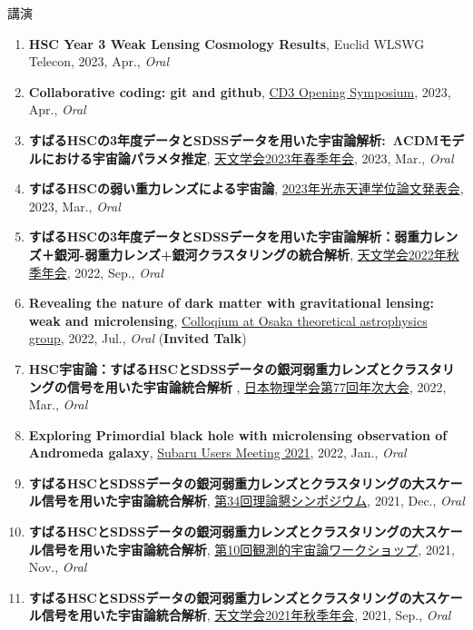 \begin{rSection}{講演}
\begin{enumerate}[itemsep=0pt, parsep=0pt, topsep=0pt, partopsep=0pt]
\item \textbf{HSC Year 3 Weak Lensing Cosmology Results}, Euclid WLSWG Telecon, 2023, Apr., \textit{Oral}
\item \textbf{Collaborative coding: git and github}, \href{https://cd3.ipmu.jp/opening/}{CD3 Opening Symposium}, 2023, Apr., \textit{Oral}
\item \textbf{すばるHSCの3年度データとSDSSデータを用いた宇宙論解析: ΛCDMモデルにおける宇宙論パラメタ推定}, \href{https://www.asj.or.jp/nenkai/archive/2023a/pdf/U20a.pdf}{天文学会2023年春季年会}, 2023, Mar., \textit{Oral}
\item \textbf{すばるHSCの弱い重力レンズによる宇宙論}, \href{http://gopira.jp/Dthesis2022/program.html}{2023年光赤天連学位論文発表会}, 2023, Mar., \textit{Oral}
\item \textbf{すばるHSCの3年度データとSDSSデータを用いた宇宙論解析：弱重力レンズ＋銀河-弱重力レンズ+銀河クラスタリングの統合解析}, \href{https://www.asj.or.jp/nenkai/archive/2022b/pdf/U15a.pdf}{天文学会2022年秋季年会}, 2022, Sep., \textit{Oral}
\item \textbf{Revealing the nature of dark matter with gravitational lensing: weak and microlensing}, \href{http://astro-osaka.jp/OUTAP/colloquium-abstracts.html#sugiyama}{Colloqium at Osaka theoretical astrophysics group}, 2022, Jul., \textit{Oral} (\textbf{Invited Talk})
\item \textbf{HSC宇宙論：すばるHSCとSDSSデータの銀河弱重力レンズとクラスタリングの信号を用いた宇宙論統合解析 }, \href{https://www.jps.or.jp/activities/meetings/annual/annual-index.php}{日本物理学会第77回年次大会}, 2022, Mar., \textit{Oral}
\item \textbf{Exploring Primordial black hole with microlensing observation of Andromeda galaxy}, \href{https://subarutelescope.org/Science/SubaruUM/SubaruUM2021/}{Subaru Users Meeting 2021}, 2022, Jan., \textit{Oral}
\item \textbf{すばるHSCとSDSSデータの銀河弱重力レンズとクラスタリングの大スケール信号を用いた宇宙論統合解析}, \href{https://sites.google.com/view/rironkon2021/}{第34回理論懇シンポジウム}, 2021, Dec., \textit{Oral}
\item \textbf{すばるHSCとSDSSデータの銀河弱重力レンズとクラスタリングの大スケール信号を用いた宇宙論統合解析}, \href{https://sites.google.com/view/obscosmws2021main}{第10回観測的宇宙論ワークショップ}, 2021, Nov., \textit{Oral}
\item \textbf{すばるHSCとSDSSデータの銀河弱重力レンズとクラスタリングの大スケール信号を用いた宇宙論統合解析}, \href{https://www.asj.or.jp/nenkai/archive/2021b/pdf/U05a.pdf}{天文学会2021年秋季年会}, 2021, Sep., \textit{Oral}

\end{enumerate}
\end{rSection}
